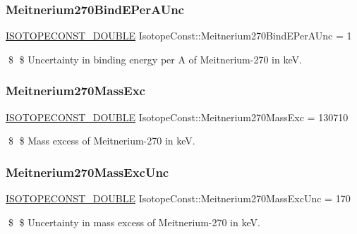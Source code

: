 \subsubsection{\texorpdfstring{Meitnerium270\+Bind\+E\+Per\+A\+Unc}{Meitnerium270BindEPerAUnc}}
{\footnotesize\ttfamily \mbox{\hyperlink{group___isotope_const-_macros_ga8f45a7272ce02c0b4c65c44636ed719a}{I\+S\+O\+T\+O\+P\+E\+C\+O\+N\+S\+T\+\_\+\+D\+O\+U\+B\+LE}} Isotope\+Const\+::\+Meitnerium270\+Bind\+E\+Per\+A\+Unc = 1}

\$ \$ Uncertainty in binding energy per A of Meitnerium-\/270 in keV. \mbox{\label{group___isotope_const-_meitnerium-_mt270_ga44ef530ab6d96c36d93bf0155431017a}} 
\subsubsection{\texorpdfstring{Meitnerium270\+Mass\+Exc}{Meitnerium270MassExc}}
{\footnotesize\ttfamily \mbox{\hyperlink{group___isotope_const-_macros_ga8f45a7272ce02c0b4c65c44636ed719a}{I\+S\+O\+T\+O\+P\+E\+C\+O\+N\+S\+T\+\_\+\+D\+O\+U\+B\+LE}} Isotope\+Const\+::\+Meitnerium270\+Mass\+Exc = 130710}

\$ \$ Mass excess of Meitnerium-\/270 in keV. \mbox{\label{group___isotope_const-_meitnerium-_mt270_ga587ce8861d2258bd8fe3417800ad6f35}} 
\subsubsection{\texorpdfstring{Meitnerium270\+Mass\+Exc\+Unc}{Meitnerium270MassExcUnc}}
{\footnotesize\ttfamily \mbox{\hyperlink{group___isotope_const-_macros_ga8f45a7272ce02c0b4c65c44636ed719a}{I\+S\+O\+T\+O\+P\+E\+C\+O\+N\+S\+T\+\_\+\+D\+O\+U\+B\+LE}} Isotope\+Const\+::\+Meitnerium270\+Mass\+Exc\+Unc = 170}

\$ \$ Uncertainty in mass excess of Meitnerium-\/270 in keV. \mbox{\label{group___isotope_const-_meitnerium-_mt270_ga389e44d39d48c30d020beac4f255a04b}} 
